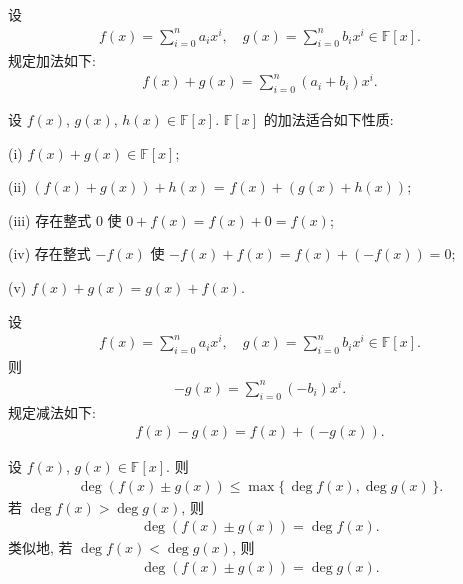 \begin{definition}
    设
    \begin{align*}
        f(x) = \sum_{i=0}^n a_i x^i, \quad g(x) = \sum_{i=0}^n b_i x^i \in \mathbb{F}[x].
    \end{align*}
    规定加法如下:
    \begin{align*}
        f(x) + g(x) = \sum_{i=0}^n (a_i + b_i) x^i.
    \end{align*}
\end{definition}

\begin{proposition}
    设 $f(x)$, $g(x)$, $h(x) \in \mathbb{F}[x]$. $\mathbb{F}[x]$ 的加法适合如下性质:

    (i) $f(x) + g(x) \in \mathbb{F}[x]$;

    (ii) $(f(x) + g(x)) + h(x)$ = $f(x) + (g(x) + h(x))$;

    (iii) 存在整式 $0$ 使 $0 + f(x) = f(x) + 0 = f(x)$;

    (iv) 存在整式 $-f(x)$ 使 $-f(x) + f(x) = f(x) + (-f(x)) = 0$;

    (v) $f(x) + g(x) = g(x) + f(x)$.
\end{proposition}

\begin{definition}
    设
    \begin{align*}
        f(x) = \sum_{i=0}^n a_i x^i, \quad g(x) = \sum_{i=0}^n b_i x^i \in \mathbb{F}[x].
    \end{align*}
    则
    \begin{align*}
        -g(x) = \sum_{i=0}^n (-b_i) x^i.
    \end{align*}
    规定减法如下:
    \begin{align*}
        f(x) - g(x) = f(x) + (-g(x)).
    \end{align*}
\end{definition}

\begin{proposition}
    设 $f(x)$, $g(x) \in \mathbb{F}[x]$. 则
    \begin{align*}
        \deg {(f(x) \pm g(x))} \leq \max \{\, \deg f(x), \deg g(x) \,\}.
    \end{align*}
    若 $\deg f(x) > \deg g(x)$, 则
    \begin{align*}
        \deg {(f(x) \pm g(x))} = \deg f(x).
    \end{align*}
    类似地, 若 $\deg f(x) < \deg g(x)$, 则
    \begin{align*}
        \deg {(f(x) \pm g(x))} = \deg g(x).
    \end{align*}
\end{proposition}

